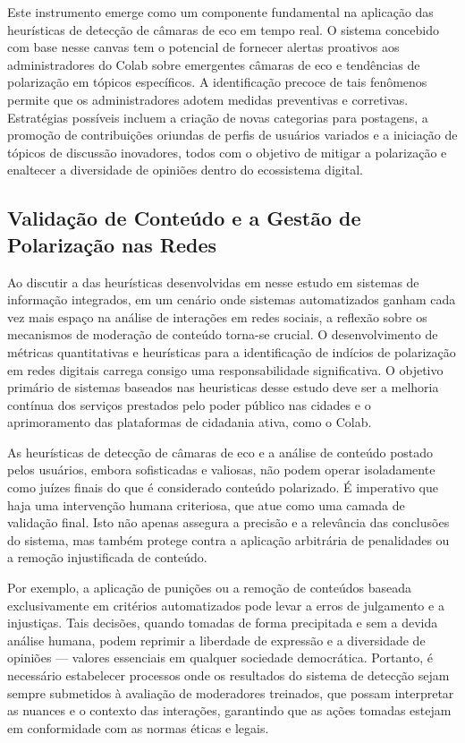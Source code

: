 Este instrumento emerge como um componente fundamental na aplicação das heurísticas de detecção de câmaras de eco em tempo real. O sistema concebido com base nesse canvas tem o potencial de fornecer alertas proativos aos administradores do Colab sobre emergentes câmaras de eco e tendências de polarização em tópicos específicos. A identificação precoce de tais fenômenos permite que os administradores adotem medidas preventivas e corretivas. Estratégias possíveis incluem a criação de novas categorias para postagens, a promoção de contribuições oriundas de perfis de usuários variados e a iniciação de tópicos de discussão inovadores, todos com o objetivo de mitigar a polarização e enaltecer a diversidade de opiniões dentro do ecossistema digital.

\subsection*{Validação de Conteúdo e a Gestão de Polarização nas Redes}

Ao discutir a das heurísticas desenvolvidas em nesse estudo em sistemas de informação integrados, em um cenário onde sistemas automatizados ganham cada vez mais espaço na análise de interações em redes sociais, a reflexão sobre os mecanismos de moderação de conteúdo torna-se crucial. O desenvolvimento de métricas quantitativas e heurísticas para a identificação de indícios de polarização em redes digitais carrega consigo uma responsabilidade significativa. O objetivo primário de sistemas baseados nas heuristicas desse estudo deve ser a melhoria contínua dos serviços prestados pelo poder público nas cidades e o aprimoramento das plataformas de cidadania ativa, como o Colab.

As heurísticas de detecção de câmaras de eco e a análise de conteúdo postado pelos usuários, embora sofisticadas e valiosas, não podem operar isoladamente como juízes finais do que é considerado conteúdo polarizado. É imperativo que haja uma intervenção humana criteriosa, que atue como uma camada de validação final. Isto não apenas assegura a precisão e a relevância das conclusões do sistema, mas também protege contra a aplicação arbitrária de penalidades ou a remoção injustificada de conteúdo.

Por exemplo, a aplicação de punições ou a remoção de conteúdos baseada exclusivamente em critérios automatizados pode levar a erros de julgamento e a injustiças. Tais decisões, quando tomadas de forma precipitada e sem a devida análise humana, podem reprimir a liberdade de expressão e a diversidade de opiniões — valores essenciais em qualquer sociedade democrática. Portanto, é necessário estabelecer processos onde os resultados do sistema de detecção sejam sempre submetidos à avaliação de moderadores treinados, que possam interpretar as nuances e o contexto das interações, garantindo que as ações tomadas estejam em conformidade com as normas éticas e legais.

